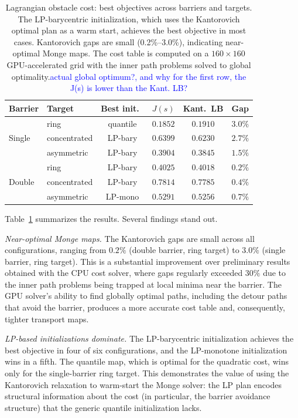 \documentclass[12pt,leqno]{amsart}
\newcommand{\zihe}[1]{\textcolor{blue}{#1}}
\begin{document}
\begin{table}[t]
    \centering
    \caption{Lagrangian obstacle cost: best objectives across barriers and targets.  The LP-barycentric initialization, which uses the Kantorovich optimal plan as a warm start, achieves the best objective in most cases.  Kantorovich gaps are small (0.2\%--3.0\%), indicating near-optimal Monge maps. The cost table is computed on a $160 \times 160$ GPU-accelerated grid with the inner path problems solved to global optimality.\zihe{actual global optimum?, and why for the first row, the J(s) is lower than the Kant. LB?}}
    \label{tab:lagrangian-results}
    \small
    \begin{tabular}{llcccl}
        \toprule
        Barrier & Target & Best init.\ & $J(s)$ & Kant.\ LB & Gap \\
        \midrule
        \multirow{3}{*}{Single}
        & ring         & quantile & $0.1852$ & $0.1910$ & $3.0\%$ \\
        & concentrated & LP-bary  & $0.6399$ & $0.6230$ & $2.7\%$ \\
        & asymmetric   & LP-bary  & $0.3904$ & $0.3845$ & $1.5\%$ \\
        \midrule
        \multirow{3}{*}{Double}
        & ring         & LP-bary  & $0.4025$ & $0.4018$ & $0.2\%$ \\
        & concentrated & LP-bary  & $0.7814$ & $0.7785$ & $0.4\%$ \\
        & asymmetric   & LP-mono  & $0.5291$ & $0.5256$ & $0.7\%$ \\
        \bottomrule
    \end{tabular}
\end{table}

Table~\ref{tab:lagrangian-results} summarizes the results.  Several findings stand out.

\emph{Near-optimal Monge maps.}  The Kantorovich gaps are small across all configurations, ranging from $0.2\%$ (double barrier, ring target) to $3.0\%$ (single barrier, ring target).  This is a substantial improvement over preliminary results obtained with the CPU cost solver, where gaps regularly exceeded $30\%$ due to the inner path problems being trapped at local minima near the barrier.  The GPU solver's ability to find globally optimal paths, including the detour paths that avoid the barrier, produces a more accurate cost table and, consequently, tighter transport maps.

\emph{LP-based initializations dominate.}  The LP-barycentric initialization achieves the best objective in four of six configurations, and the LP-monotone initialization wins in a fifth.  The quantile map, which is optimal for the quadratic cost, wins only for the single-barrier ring target.  This demonstrates the value of using the Kantorovich relaxation to warm-start the Monge solver: the LP plan encodes structural information about the cost (in particular, the barrier avoidance structure) that the generic quantile initialization lacks.
\end{document}
